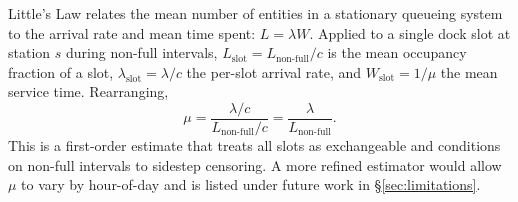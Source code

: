 Little's Law \cite{little1961} relates the mean number of entities in a stationary queueing system to the arrival rate and mean time spent: $L = \lambda W$. Applied to a single dock slot at station $s$ during non-full intervals, $L_{\text{slot}} = L_{\text{non-full}} / c$ is the mean occupancy fraction of a slot, $\lambda_{\text{slot}} = \lambda / c$ the per-slot arrival rate, and $W_{\text{slot}} = 1/\mu$ the mean service time. Rearranging,
\begin{equation}
\mu = \frac{\lambda / c}{L_{\text{non-full}} / c} = \frac{\lambda}{L_{\text{non-full}}}.
\end{equation}
This is a first-order estimate that treats all slots as exchangeable and conditions on non-full intervals to sidestep censoring. A more refined estimator would allow $\mu$ to vary by hour-of-day and is listed under future work in \S\ref{sec:limitations}.
